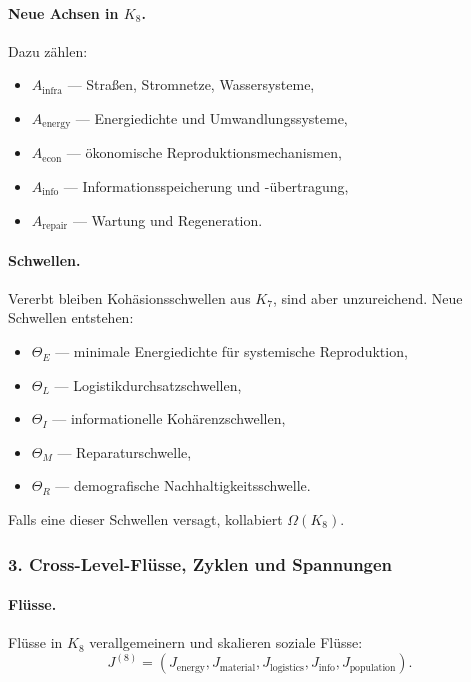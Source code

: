 \paragraph{Neue Achsen in \texorpdfstring{$K_8$}{K_8}.}
Dazu zählen:
\begin{itemize}
  \item $A_{\mathrm{infra}}$ — Straßen, Stromnetze, Wassersysteme,
  \item $A_{\mathrm{energy}}$ — Energiedichte und Umwandlungssysteme,
  \item $A_{\mathrm{econ}}$ — ökonomische Reproduktionsmechanismen,
  \item $A_{\mathrm{info}}$ — Informationsspeicherung und -übertragung,
  \item $A_{\mathrm{repair}}$ — Wartung und Regeneration.
\end{itemize}

\paragraph{Schwellen.}
Vererbt bleiben Kohäsionsschwellen aus $K_7$, sind aber unzureichend.
Neue Schwellen entstehen:
\begin{itemize}
  \item $\Theta_E$ — minimale Energiedichte für systemische Reproduktion,
  \item $\Theta_L$ — Logistikdurchsatzschwellen,
  \item $\Theta_I$ — informationelle Kohärenzschwellen,
  \item $\Theta_M$ — Reparaturschwelle,
  \item $\Theta_R$ — demografische Nachhaltigkeitsschwelle.
\end{itemize}

Falls eine dieser Schwellen versagt, kollabiert $\Omega(K_8)$.

\subsubsection{3. Cross-Level-Flüsse, Zyklen und Spannungen}

\paragraph{Flüsse.}
Flüsse in $K_8$ verallgemeinern und skalieren soziale Flüsse:
\[
J^{(8)} = (J_{\mathrm{energy}}, J_{\mathrm{material}},
          J_{\mathrm{logistics}}, J_{\mathrm{info}},
          J_{\mathrm{population}}).
\]

